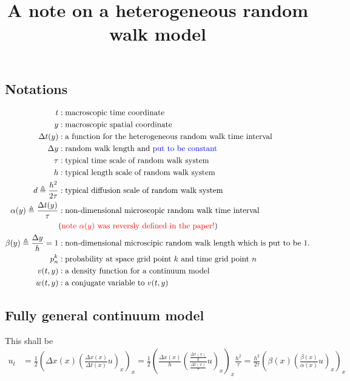\documentclass[a4paper,11pt]{article}
\def\red{\color{red}}
\def\blue{\color{blue}}
\def\t{{\tau}}
\def\l{{h}}
\theoremstyle{remark}
\begin{document}
\title{A note on a heterogeneous random walk model}
\date{}

\maketitle




\subsection{Notations}
\begin{align*}
 t &: \text{macroscopic time coordinate}\\
 y &: \text{macroscopic spatial coordinate}\\
 \Delta t(y) &: \text{a function for the heterogeneous random walk time interval}\\
 \Delta y &: \text{random walk length and {\blue put to be constant}}\\
 \tau &: \text{typical time scale of random walk system}\\
 h &: \text{typical length scale of random walk system}\\
 d \triangleq \frac{\l^2}{2\tau} &: \text{typical diffusion scale of random walk system}\\
 \alpha(y) \triangleq \frac{\Delta t(y)}{\tau} &: \text{non-dimensional microscopic random walk time interval}\\
 & \text{({\red note $\alpha(y)$ was reversly defined in the paper!})}\\
 \beta(y) \triangleq \frac{\Delta y}{\l} = 1 &: \text{non-dimensional microscipic random walk length which is put to be $1$.}\\
 p^k_n &: \text{probability at space grid point $k$ and time grid point $n$}\\
 v(t,y) &: \text{a density function for a continuum model}\\
 w(t,y) &: \text{a conjugate variable to $v(t,y)$}\\
\end{align*}

\subsection{Fully general continuum model}
This shall be
\begin{align*}
 u_t &= \frac{1}{2} \left( \Delta x(x) \left( \frac{\Delta x(x)}{\Delta t(x)} u \right)_x\right)_x= \frac{1}{2} \left( \tfrac{\Delta x(x)}{\l} \left( \frac{\tfrac{\Delta x(x)}{\l}}{\tfrac{\Delta t(x)}{\tau}} u \right)_x\right)_x \frac{\l^2}{\t} =  \frac{\l^2}{2\t} \left( \beta(x) \left( \frac{\beta(x)}{\alpha(x)} u \right)_x\right)_x
\end{align*}
\end{document}
